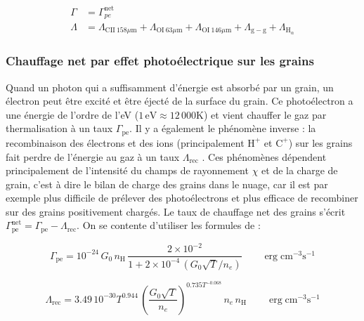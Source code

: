 \begin{equation}
    \begin{split}
        \Gamma &= \Gamma_{pe}^{\mathrm{net}} \\
        \Lambda &=   \Lambda_{\mathrm{CII}\ 158 \mu \mathrm{m}} + \Lambda_{\mathrm{OI}\ 63 \mu \mathrm{m}} + \Lambda_{\mathrm{OI}\ 146 \mu \mathrm{m}}  + \Lambda_{\mathrm{g}-\mathrm{g}} + \Lambda_{\mathrm{H}_\alpha}
    \end{split}
\end{equation}


\subsubsection{Chauffage net par effet photoélectrique sur les grains}

Quand un photon qui a suffisamment d'énergie est absorbé par un grain, un électron peut être excité et être éjecté de la surface du grain. Ce photoélectron a une énergie de l'ordre de l'eV ($1\,\mathrm{eV}\approx 12\,000$K) et vient chauffer le gaz par thermalisation à un taux $\Gamma_{\mathrm{pe}}$. Il y a également le phénomène inverse : la recombinaison des électrons et des ions (principalement $\mathrm{H}^+$ et $\mathrm{C}^+$) sur les grains fait perdre de l'énergie au gaz à un taux $\Lambda_{\mathrm{rec}}$ \cite{Lequeux}. Ces phénomènes dépendent principalement de l'intensité du champs de rayonnement $\chi$ et de la charge de grain, c'est à dire le bilan de charge des grains dans le nuage, car il est par exemple plus difficile de prélever des photoélectrons et plus efficace de recombiner sur des grains positivement chargés. Le taux de chauffage net des grains s'écrit $\Gamma^{\mathrm{net}}_{\mathrm{pe}} = \Gamma_{\mathrm{pe}} - \Lambda_{\mathrm{rec}}$. On se contente d'utiliser les formules de \cite{BakesTielens1994} :

\begin{equation}
    \Gamma_{\mathrm{pe}} = 10^{-24}\,G_0\,n_\mathrm{H}\, \frac{2\times 10^{-2}}{1 + 2\times 10^{-4}\,(G_0 \sqrt{T}/n_e)} \qquad \operatorname{erg} \mathrm{cm}^{-3} \mathrm{s}^{-1}
    \label{eq:Rollig:pe}
\end{equation}

\begin{equation}
    \Lambda_{\mathrm{rec}} = 3.49\,10^{-30} T^{0.944} \, (\frac{G_0 \sqrt{T}}{n_e})^{0.735 T^{-0.068}} \, n_e \, n_\mathrm{H} \qquad \operatorname{erg} \mathrm{cm}^{-3} \mathrm{s}^{-1}
    \label{eq:Rollig:rece}
\end{equation}

